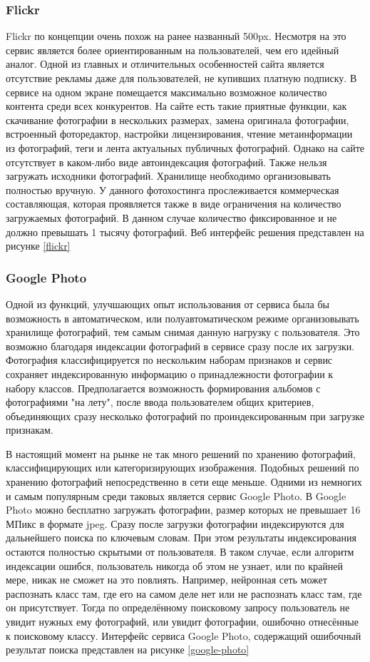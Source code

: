 \subsubsection{Flickr}
Flickr по концепции очень похож на ранее названный 500px.
Несмотря на это сервис является более ориентированным на пользователей, чем его идейный аналог.
Одной из главных и отличительных особенностей сайта является отсутствие рекламы даже для пользователей, не купивших платную подписку. 
В сервисе на одном экране помещается максимально возможное количество контента среди всех конкурентов.
На сайте есть такие приятные функции, как скачивание фотографии в нескольких размерах, замена оригинала фотографии, встроенный фоторедактор, настройки лицензирования, чтение метаинформации из фотографий, теги и лента актуальных публичных фотографий.
Однако на сайте отсутствует в каком-либо виде автоиндексация фотографий.
Также нельзя загружать исходники фотографий.
Хранилище необходимо организовывать полностью вручную.
У данного фотохостинга прослеживается коммерческая составляющая, которая проявляется также в виде ограничения на количество загружаемых фотографий.
В данном случае количество фиксированное и не должно превышать 1 тысячу фотографий.
Веб интерфейс решения представлен на рисунке \ref{flickr}

\subsubsection{Google Photo}

Одной из функций, улучшающих опыт использования от сервиса была бы возможность в автоматическом, или полуавтоматическом режиме организовывать хранилище фотографий, тем самым снимая данную нагрузку с пользователя.
Это возможно благодаря индексации фотографий в сервисе сразу после их загрузки. 
Фотография классифицируется по нескольким наборам признаков и сервис сохраняет индексированную информацию о принадлежности фотографии к набору классов.
Предполагается возможность формирования альбомов с фотографиями "на лету", после ввода пользователем общих критериев, объединяющих сразу несколько фотографий по проиндексированным при загрузке признакам.

В настоящий момент на рынке не так много решений по хранению фотографий, классифицирующих или категоризирующих изображения.
Подобных решений по хранению фотографий непосредственно в сети еще меньше.
Одними из немногих и самым популярным среди таковых является сервис Google Photo. 
В Google Photo можно бесплатно загружать фотографии, размер которых не превышает 16 МПикс в формате jpeg. 
Сразу после загрузки фотографии индексируются для дальнейшего поиска по ключевым словам.
При этом результаты индексирования остаются полностью скрытыми от пользователя. 
В таком случае, если алгоритм индексации ошибся, пользователь никогда об этом не узнает, или по крайней мере, никак не сможет на это повлиять. 
Например, нейронная сеть может распознать класс там, где его на самом деле нет или не распознать класс там, где он присутствует.
Тогда по определённому поисковому запросу пользователь не увидит нужных ему фотографий, или увидит фотографии, ошибочно отнесённые к поисковому классу.
Интерфейс сервиса Google Photo, содержащий ошибочный результат поиска представлен на рисунке \ref{google-photo}

